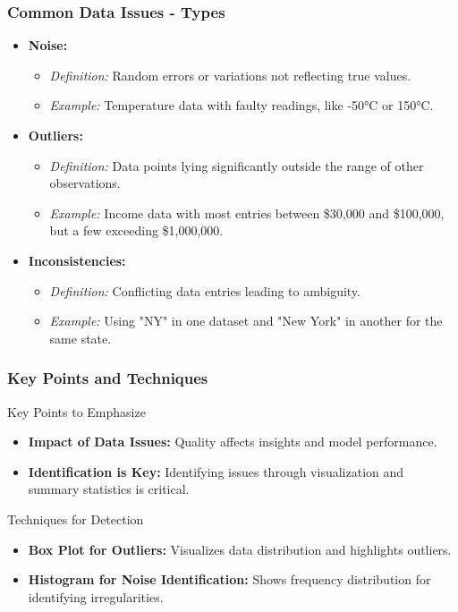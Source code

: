\documentclass[aspectratio=169]{beamer}
\begin{document}
\begin{frame}[fragile]
    \frametitle{Common Data Issues - Types}
    \begin{itemize}
        \item \textbf{Noise:}
        \begin{itemize}
            \item \textit{Definition:} Random errors or variations not reflecting true values.
            \item \textit{Example:} Temperature data with faulty readings, like -50°C or 150°C.
        \end{itemize}
        
        \item \textbf{Outliers:}
        \begin{itemize}
            \item \textit{Definition:} Data points lying significantly outside the range of other observations.
            \item \textit{Example:} Income data with most entries between \$30,000 and \$100,000, but a few exceeding \$1,000,000.
        \end{itemize}
        
        \item \textbf{Inconsistencies:}
        \begin{itemize}
            \item \textit{Definition:} Conflicting data entries leading to ambiguity.
            \item \textit{Example:} Using "NY" in one dataset and "New York" in another for the same state.
        \end{itemize}
    \end{itemize}
\end{frame}

\begin{frame}[fragile]
    \frametitle{Key Points and Techniques}
    \begin{block}{Key Points to Emphasize}
        \begin{itemize}
            \item \textbf{Impact of Data Issues:} Quality affects insights and model performance.
            \item \textbf{Identification is Key:} Identifying issues through visualization and summary statistics is critical.
        \end{itemize}
    \end{block}
    
    \begin{block}{Techniques for Detection}
        \begin{itemize}
            \item \textbf{Box Plot for Outliers:} Visualizes data distribution and highlights outliers.
            \item \textbf{Histogram for Noise Identification:} Shows frequency distribution for identifying irregularities.
        \end{itemize}
    \end{block}
\end{frame}
\end{document}
